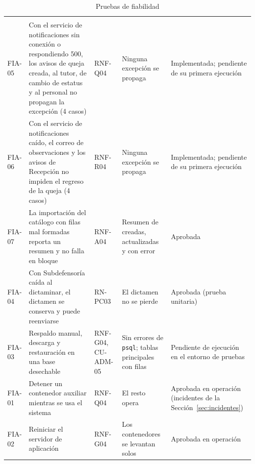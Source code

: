 	\small
	\renewcommand{\arraystretch}{1.2}
	\setlength{\tabcolsep}{4pt}
	\begin{longtable}{|p{1.2cm}|L{5.6cm}|L{2.2cm}|L{2.6cm}|L{2.9cm}|}
		\caption{Pruebas de fiabilidad}
		\label{tab:pruebas_fiabilidad} \\
		\hline
		 &  &  &
		 &  \\
		\hline
		\endfirsthead
		\hline
		 &  &  &
		 &  \\
		\hline
		\endhead
		FIA-05 & Con el servicio de notificaciones sin conexión o respondiendo 500, los avisos de queja
		creada, al tutor, de cambio de estatus y al personal no propagan la excepción (4 casos) & RNF-Q04 &
		Ninguna excepción se propaga & Implementada; pendiente de su primera ejecución \\ \hline
		FIA-06 & Con el servicio de notificaciones caído, el correo de observaciones y los avisos de
		Recepción no impiden el regreso de la queja (4 casos) & RNF-R04 & Ninguna excepción se propaga &
		Implementada; pendiente de su primera ejecución \\ \hline
		FIA-07 & La importación del catálogo con filas mal formadas reporta un resumen y no falla en bloque
		& RNF-A04 & Resumen de creadas, actualizadas y con error & Aprobada \\ \hline
		FIA-04 & Con Subdefensoría caída al dictaminar, el dictamen se conserva y puede reenviarse &
		RN-PC03 & El dictamen no se pierde & Aprobada (prueba unitaria) \\ \hline
		FIA-03 & Respaldo manual, descarga y restauración en una base desechable & RNF-G04, CU-ADM-05 & Sin
		errores de \texttt{psql}; tablas principales con filas & Pendiente de ejecución en el entorno de
		pruebas \\ \hline
		FIA-01 & Detener un contenedor auxiliar mientras se usa el sistema & RNF-Q04 & El resto opera &
		Aprobada en operación (incidentes de la Sección~\ref{sec:incidentes}) \\ \hline
		FIA-02 & Reiniciar el servidor de aplicación & RNF-G04 & Los contenedores se levantan solos &
		Aprobada en operación \\ \hline
	\end{longtable}
	\normalsize

